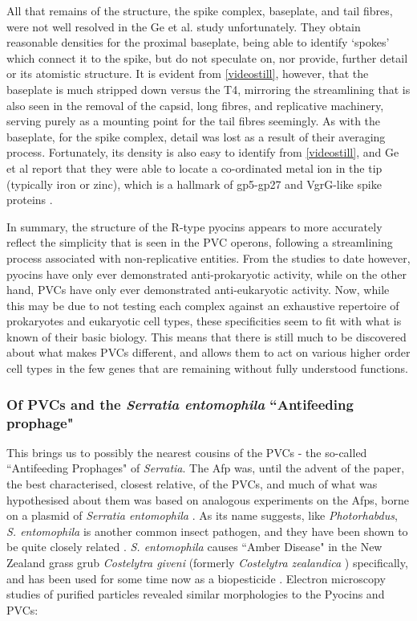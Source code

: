 All that remains of the structure, the spike complex, baseplate, and tail fibres, were not well resolved in the Ge et al. study unfortunately. They obtain reasonable densities for the proximal baseplate, being able to identify `spokes' which connect it to the spike, but do not speculate on, nor provide, further detail or its atomistic structure. It is evident from \vref{videostill}, however, that the baseplate is much stripped down versus the T4, mirroring the streamlining that is also seen in the removal of the capsid, long fibres, and replicative machinery, serving purely as a mounting point for the tail fibres seemingly. As with the baseplate, for the spike complex, detail was lost as a result of their averaging process. Fortunately, its density is also easy to identify from \vref{videostill}, and Ge et al report that they were able to locate a co-ordinated metal ion in the tip (typically iron or zinc), which is a hallmark of gp5-gp27 and VgrG-like spike proteins \citep{Shneider2013, Kube2015a, Browning2012}.

In summary, the structure of the R-type pyocins appears to more accurately reflect the simplicity that is seen in the PVC operons, following a streamlining process associated with non-replicative entities. From the studies to date however, pyocins have only ever demonstrated anti-prokaryotic activity, while on the other hand, PVCs have only ever demonstrated anti-eukaryotic activity. Now, while this may be due to not testing each complex against an exhaustive repertoire of prokaryotes and eukaryotic cell types, these specificities seem to fit with what is known of their basic biology. This means that there is still much to be discovered about what makes PVCs different, and allows them to act on various higher order cell types in the few genes that are remaining without fully understood functions.



\subsubsection{Of PVCs and the \emph{Serratia entomophila} ``Antifeeding prophage"}\label{afp}
This brings us to possibly the nearest cousins of the PVCs - the so-called ``Antifeeding Prophages" of \emph{Serratia}. The Afp was, until the advent of the \cite{Ge2015} paper, the best characterised, closest relative, of the PVCs, and much of what was hypothesised about them was based on analogous experiments on the Afps, borne on a plasmid of \emph{Serratia entomophila} \citep{Rybakova1994}. As its name suggests, like \emph{Photorhabdus}, \emph{S. entomophila} is another common insect pathogen, and they have been shown to be quite closely related \citep{Duchaud2003, Sproer1999, Brillard2002b}. \emph{S. entomophila} causes ``Amber Disease" in the New Zealand grass grub \emph{Costelytra giveni} (formerly \emph{Costelytra zealandica} \citep{Coca-Abia2016}) specifically, and has been used for some time now as a biopesticide \citep{Chattopadhyay2012, OpenderKoul2011}. Electron microscopy studies of purified particles revealed similar morphologies to the Pyocins and PVCs:


